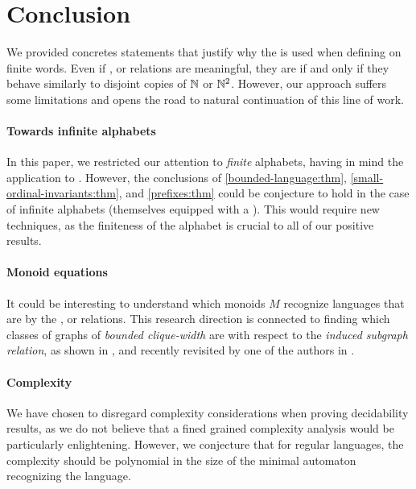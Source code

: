 \section{Conclusion}
\label{conclusion:sec}

We provided concretes statements that justify why the 
is used when defining  on finite words. Even if
,  or  relations are meaningful, they are
 if and only if they behave similarly to disjoint copies
of $\mathbb{N}$ or $\mathbb{N}^2$. However, our approach suffers some limitations 
and opens the road to natural continuation of this line of work.

\paragraph*{Towards infinite alphabets} In this paper, we restricted our
attention to \emph{finite} alphabets, having in mind the application to
. However, the conclusions of
\cref{bounded-language:thm}, \cref{small-ordinal-invariants:thm}, and
\cref{prefixes:thm} could be conjecture to hold in the case of infinite
alphabets (themselves equipped with a ). This would
require new techniques, as the finiteness of the alphabet is crucial to all of
our positive results.

\paragraph*{Monoid equations}  It could be interesting to understand which
monoids $M$ recognize languages that are  by the
,  or  relations. This research direction is
connected to finding which classes of graphs of \emph{bounded clique-width} are
 with respect to the \emph{induced subgraph relation},
as shown in \cite{DRT10}, and recently revisited by one of the authors in
\cite{L24:arxiv:v2}.

\paragraph*{Complexity} We have chosen to disregard complexity considerations
when proving decidability results, as we do not believe that a fined grained
complexity analysis would be particularly enlightening. However, we conjecture
that for regular languages, the complexity should be polynomial in the size of
the minimal automaton recognizing the language.


